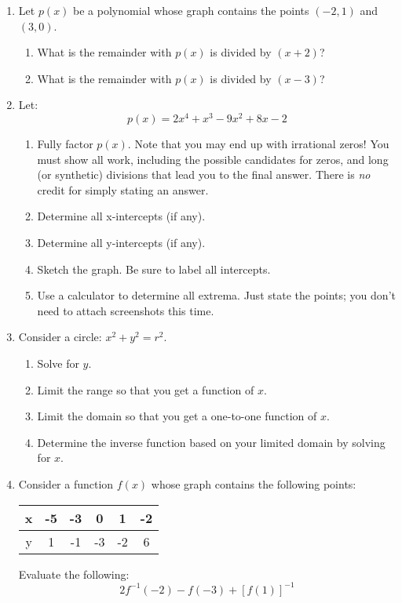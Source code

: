 \documentclass[letterpaper,12pt,fleqn]{article}
\begin{document}
\begin{enumerate}

\item Let $p(x)$ be a polynomial whose graph contains the points $(-2,1)$ and
  $(3,0)$.
  \begin{enumerate}
  \item What is the remainder with $p(x)$ is divided by $(x+2)$?
  \item What is the remainder with $p(x)$ is divided by $(x-3)$?
  \end{enumerate}

\item Let:
  \[p(x)=2x^4+x^3-9x^2+8x-2\]
  \begin{enumerate}
  \item Fully factor $p(x)$. Note that you may end up with irrational zeros!
    You must show all work, including the possible candidates for zeros, and
    long (or synthetic) divisions that lead you to the final answer.  There is
    \emph{no} credit for simply stating an answer.
  \item Determine all x-intercepts (if any).
  \item Determine all y-intercepts (if any).
  \item Sketch the graph. Be sure to label all intercepts.
  \item Use a calculator to determine all extrema. Just state the points; you
    don't need to attach screenshots this time.
  \end{enumerate}

\item Consider a circle: $x^2+y^2=r^2$.
  \begin{enumerate}
  \item Solve for $y$.
  \item Limit the range so that you get a function of $x$.
  \item Limit the domain so that you get a one-to-one function of $x$.
  \item Determine the inverse function based on your limited domain by solving
    for $x$.
  \end{enumerate}

\item Consider a function $f(x)$ whose graph contains the following points:

  \begin{tabular}{|c|c|c|c|c|c|}
    \hline
    x & -5 & -3 & 0 & 1 & -2 \\
    \hline
    y & 1 & -1 & -3 & -2 & 6 \\
    \hline
  \end{tabular}

  Evaluate the following:
  \[2f^{-1}(-2)-f(-3)+[f(1)]^{-1}\]
  
\end{enumerate}
\end{document}
